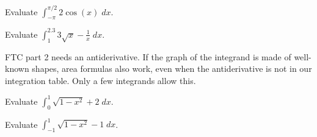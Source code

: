\documentclass[../main.tex]{subfiles}
\begin{document}
\begin{exercise}
  Evaluate \(\int_{-\pi}^{\pi/2} 2\cos(x) \;dx\).

\end{exercise}

\begin{exercise}
  Evaluate \(\int_{1}^{2.3} 3 \sqrt{x} - \frac{1}{x} \;dx\).

\end{exercise}
\clearpage

FTC part 2 needs an antiderivative. If the graph of the integrand is made of well-known shapes, area formulas also work, even when the antiderivative is not in our integration table. Only a few integrands allow this.

\begin{exercise}
  Evaluate \(\int_{0}^{1} \sqrt{1 - x^{2}} + 2 \;dx\).

  \blanks*
\end{exercise}

\begin{exercise}
  Evaluate \(\int_{-1}^{1} \sqrt{1 - x^{2}} - 1 \;dx\).

  \blanks*
\end{exercise}
\end{document}
